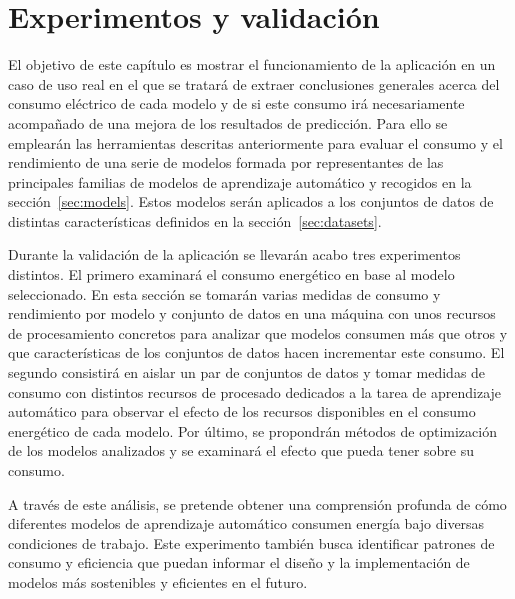 \chapter{Experimentos y validación}
\label{chap:experimentos}

El objetivo de este capítulo es mostrar el funcionamiento de la aplicación en un caso de uso real en el que se tratará de extraer conclusiones generales acerca del consumo eléctrico de cada modelo y de si este consumo irá necesariamente acompañado de una mejora de los resultados de predicción.
Para ello se emplearán las herramientas descritas anteriormente para evaluar el consumo y el rendimiento de una serie de modelos formada por representantes de las principales familias de modelos de aprendizaje automático y recogidos en la sección~\ref{sec:models}. Estos modelos serán aplicados a los conjuntos de datos de distintas características definidos en la sección~\ref{sec:datasets}.

Durante la validación de la aplicación se llevarán acabo tres experimentos distintos.
El primero examinará el consumo energético en base al modelo seleccionado. En esta sección se tomarán varias medidas de consumo y rendimiento por modelo y conjunto de datos en una máquina con unos recursos de procesamiento concretos para analizar que modelos consumen más que otros y que características de los conjuntos de datos hacen incrementar este consumo.
El segundo consistirá en aislar un par de conjuntos de datos y tomar medidas de consumo con distintos recursos de procesado dedicados a la tarea de aprendizaje automático para observar el efecto de los recursos disponibles en el consumo energético de cada modelo.
Por último, se propondrán métodos de optimización de los modelos analizados y se examinará el efecto que pueda tener sobre su consumo. 

A través de este análisis, se pretende obtener una comprensión profunda de cómo diferentes modelos de aprendizaje automático consumen energía bajo diversas condiciones de trabajo. Este experimento también busca identificar patrones de consumo y eficiencia que puedan informar el diseño y la implementación de modelos más sostenibles y eficientes en el futuro.



